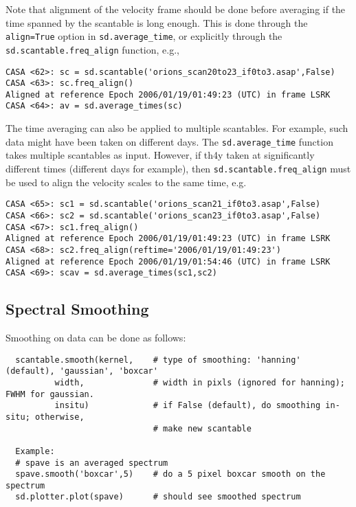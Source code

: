Note that alignment of the velocity frame should be done before
averaging if the time spanned by the scantable is 
long enough.  This is done through the {\tt align=True} option in
{\tt sd.average\_time}, or explicitly through the
{\tt sd.scantable.freq\_align} function, e.g.,
\small
\begin{verbatim}
CASA <62>: sc = sd.scantable('orions_scan20to23_if0to3.asap',False)
CASA <63>: sc.freq_align()
Aligned at reference Epoch 2006/01/19/01:49:23 (UTC) in frame LSRK
CASA <64>: av = sd.average_times(sc)
\end{verbatim}
\normalsize

The time averaging can also be applied to multiple scantables.  For example, such data
might have been taken on different days.  The
{\tt sd.average\_time} function takes multiple scantables as input.
However, if th4y taken at significantly different times (different days for
example), then {\tt sd.scantable.freq\_align} must be used to align
the velocity scales to the same time, e.g.
\small
\begin{verbatim}
CASA <65>: sc1 = sd.scantable('orions_scan21_if0to3.asap',False)
CASA <66>: sc2 = sd.scantable('orions_scan23_if0to3.asap',False)
CASA <67>: sc1.freq_align()
Aligned at reference Epoch 2006/01/19/01:49:23 (UTC) in frame LSRK
CASA <68>: sc2.freq_align(reftime='2006/01/19/01:49:23')
Aligned at reference Epoch 2006/01/19/01:54:46 (UTC) in frame LSRK
CASA <69>: scav = sd.average_times(sc1,sc2)
\end{verbatim}
\normalsize

\subsection{Spectral Smoothing}
\label{subsection:sd.asap.smoothing}

Smoothing on data can be done as follows:

\small
\begin{verbatim}
  scantable.smooth(kernel,    # type of smoothing: 'hanning' (default), 'gaussian', 'boxcar'
          width,              # width in pixls (ignored for hanning); FWHM for gaussian.
          insitu)             # if False (default), do smoothing in-situ; otherwise, 
                              # make new scantable

  Example:
  # spave is an averaged spectrum
  spave.smooth('boxcar',5)    # do a 5 pixel boxcar smooth on the spectrum
  sd.plotter.plot(spave)      # should see smoothed spectrum
\end{verbatim}
\normalsize

